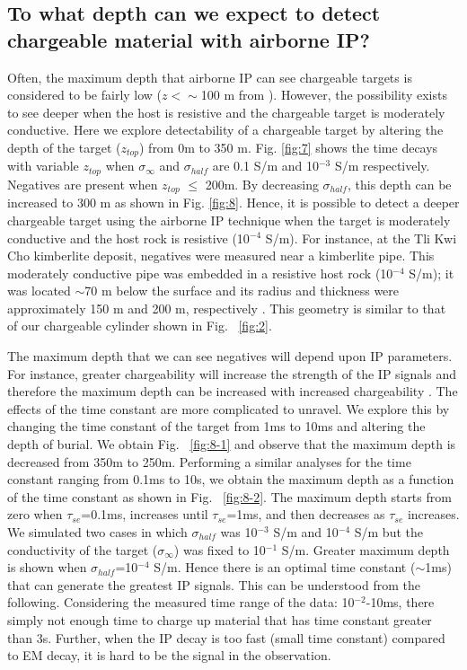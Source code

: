 \documentclass[manuscript]{geophysics}
\newcommand{\siginf}{\sigma_\infty}
\begin{document}
\subsection{To what depth can we expect to detect chargeable material with airborne IP?}
Often, the maximum depth that airborne IP can see chargeable targets is considered to be fairly low ($z<\sim$100 m from \cite{macnae2016}). However, the possibility exists to see deeper when the host is resistive and the chargeable target is moderately conductive. Here we explore detectability of a chargeable target by altering the depth of the target ($z_{top}$) from 0m to 350 m. Fig. \ref{fig:7} shows the time decays with variable $z_{top}$ when  $\siginf$ and $\sigma_{half}$ are 0.1 S/m and 10$^{-3}$ S/m respectively. Negatives are present when $z_{top}$ $\leq$ 200m. By decreasing $\sigma_{half}$, this depth can be increased to 300 m as shown in Fig. \ref{fig:8}. Hence, it is possible to detect a deeper chargeable target using the airborne IP technique when the target is moderately conductive and the host rock is resistive (10$^{-4}$ S/m). For instance, at the Tli Kwi Cho kimberlite deposit, negatives were measured near a kimberlite pipe. This moderately conductive pipe was embedded in a resistive host rock (10$^{-4}$ S/m); it was located  $\sim$70 m below the surface and its radius and thickness were approximately 150 m and 200 m, respectively \cite[]{kang2017}. This geometry is  similar to that of our chargeable cylinder shown in Fig. ~\ref{fig:2}.

The maximum depth that we can see negatives will depend upon IP parameters. For instance, greater chargeability will increase the strength of the IP signals and therefore the maximum depth can be increased with increased chargeability \cite[]{macnae2016}. The effects of the time constant are more complicated to unravel. We explore this by changing the  time constant of the target from 1ms to 10ms and altering the depth of burial.  We obtain Fig. ~\ref{fig:8-1} and observe that the maximum depth is decreased from 350m to 250m. Performing a similar analyses for the time constant ranging from  0.1ms to 10s, we obtain the maximum depth as a function of the time constant as shown in Fig. ~\ref{fig:8-2}. The maximum depth starts from zero when $\tau_{se}$=0.1ms, increases until $\tau_{se}$=1ms, and  then decreases as $\tau_{se}$ increases. We simulated two cases in which  $\sigma_{half}$ was 10$^{-3}$ S/m and 10$^{-4}$ S/m but the conductivity of the target ($\siginf$) was fixed to 10$^{-1}$ S/m. Greater maximum depth is shown when $\sigma_{half}$=10$^{-4}$ S/m.
Hence there is an optimal time constant ($\sim$1ms) that can generate the greatest IP signals. This can be understood from the following. Considering the measured time range of the data: 10$^{-2}$-10ms, there simply not enough time to charge up material that has time constant greater than 3s. Further, when the IP decay is too fast (small time constant) compared to EM decay, it is hard to be the signal in the observation.
\end{document}
